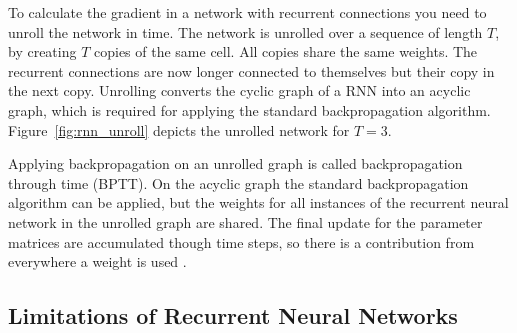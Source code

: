 \documentclass[twoside,a4paper,10pt,DIV=12,BCOR=12mm]{scrartcl}
\begin{document}
To calculate the gradient in a network with recurrent connections you need to unroll the network in time. The network
is unrolled over a sequence of length $T$, by creating $T$ copies of the same cell. All copies share the same weights.
The recurrent connections are now longer connected to themselves but their copy in the next copy. Unrolling converts 
the cyclic graph of a RNN into an acyclic graph, which is required for applying the standard backpropagation algorithm.
Figure~\ref{fig:rnn_unroll} depicts the unrolled network for $T=3$.

\begin{center}
  \label{fig:rnn_unroll}
\end{center}


Applying backpropagation on an unrolled graph is called backpropagation through time (BPTT). On the acyclic graph 
the standard backpropagation algorithm can be applied, but the weights for all instances of the recurrent neural network
in the unrolled graph are shared. The final update for the parameter matrices are accumulated though time steps, so there 
is a contribution from everywhere a weight is used \cite{werb1990bptt}.


\subsection{Limitations of Recurrent Neural Networks}
\end{document}
